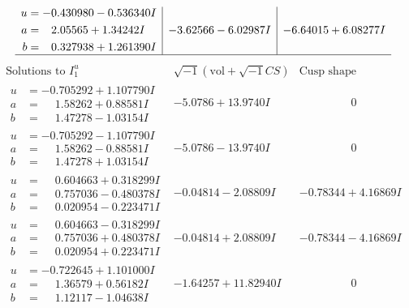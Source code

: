 \documentclass[1p]{elsarticle_modified}
\theoremstyle{definition}
\newcommand{\I}{\sqrt{-1}}
\begin{document}
$$\begin{array}{c|c|c}
\begin{aligned}
u &= -0.430980 - 0.536340 I \\
a &= \phantom{-}2.05565 + 1.34242 I \\
b &= \phantom{-}0.327938 + 1.261390 I\end{aligned}
 & -3.62566 - 6.02987 I & -6.64015 + 6.08277 I\\
 \hline 
 \end{array}$$\newpage$$\begin{array}{c|c|c}  
\text{Solutions to }I^u_{1}& \I (\text{vol} + \sqrt{-1}CS) & \text{Cusp shape}\\
 \hline 
\begin{aligned}
u &= -0.705292 + 1.107790 I \\
a &= \phantom{-}1.58262 + 0.88581 I \\
b &= \phantom{-}1.47278 - 1.03154 I\end{aligned}
 & -5.0786 + 13.9740 I & \phantom{-0.000000 } 0 \\ \hline\begin{aligned}
u &= -0.705292 - 1.107790 I \\
a &= \phantom{-}1.58262 - 0.88581 I \\
b &= \phantom{-}1.47278 + 1.03154 I\end{aligned}
 & -5.0786 - 13.9740 I & \phantom{-0.000000 } 0 \\ \hline\begin{aligned}
u &= \phantom{-}0.604663 + 0.318299 I \\
a &= \phantom{-}0.757036 - 0.480378 I \\
b &= \phantom{-}0.020954 - 0.223471 I\end{aligned}
 & -0.04814 - 2.08809 I & -0.78344 + 4.16869 I \\ \hline\begin{aligned}
u &= \phantom{-}0.604663 - 0.318299 I \\
a &= \phantom{-}0.757036 + 0.480378 I \\
b &= \phantom{-}0.020954 + 0.223471 I\end{aligned}
 & -0.04814 + 2.08809 I & -0.78344 - 4.16869 I \\ \hline\begin{aligned}
u &= -0.722645 + 1.101000 I \\
a &= \phantom{-}1.36579 + 0.56182 I \\
b &= \phantom{-}1.12117 - 1.04638 I\end{aligned}
 & -1.64257 + 11.82940 I & \phantom{-0.000000 } 0 \\ \hline\begin{aligned}

\end{aligned}
\end{array}$$
\end{document}
